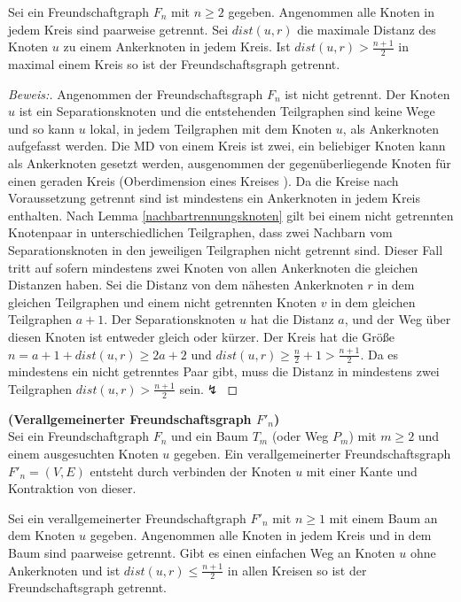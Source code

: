 \vspace{-1mm}
\begin{lem}
\label{fg}
Sei ein Freundschaftgraph $F_n$ mit $n\geq 2$ gegeben. Angenommen alle Knoten in jedem Kreis sind paarweise getrennt. Sei $dist(u,r)$ die maximale Distanz des Knoten $u$ zu einem Ankerknoten in jedem Kreis. Ist $dist(u,r)>\frac{n+1}{2}$ in maximal einem Kreis so ist der Freundschaftsgraph getrennt.
\end{lem}
\vspace{-4mm}
\begin{proof}[Beweis:]
Angenommen der Freundschaftsgraph $F_n$ ist nicht getrennt. Der Knoten $u$ ist ein Separationsknoten und die entstehenden Teilgraphen sind keine Wege und so kann $u$ lokal, in jedem Teilgraphen mit dem Knoten $u$, als Ankerknoten aufgefasst werden. Die MD von einem Kreis ist zwei, ein beliebiger Knoten kann als Ankerknoten gesetzt werden, ausgenommen der gegenüberliegende Knoten für einen geraden Kreis (Oberdimension eines Kreises \cite{upper}). Da die Kreise nach Voraussetzung getrennt sind ist mindestens ein Ankerknoten in jedem Kreis enthalten. Nach Lemma \ref{nachbartrennungsknoten} gilt bei einem nicht getrennten Knotenpaar in unterschiedlichen Teilgraphen, dass zwei Nachbarn vom Separationsknoten in den jeweiligen Teilgraphen nicht getrennt sind.\newline
Dieser Fall tritt auf sofern mindestens zwei Knoten von allen Ankerknoten die gleichen Distanzen haben. Sei die Distanz von dem nähesten Ankerknoten $r$ in dem gleichen Teilgraphen und einem nicht getrennten Knoten $v$ in dem gleichen Teilgraphen $a+1$. Der Separationsknoten $u$ hat die Distanz $a$, und der Weg über diesen Knoten ist entweder gleich oder kürzer. Der Kreis hat die Größe $n=a+1+dist(u,r)\geq 2a+2$ und $dist(u,r)\geq \frac{n}{2}+1 > \frac{n+1}{2}$. Da es mindestens ein nicht getrenntes Paar gibt, muss die Distanz in mindestens zwei Teilgraphen $dist(u,r)> \frac{n+1}{2}$ sein.$\lightning$
\end{proof}
\begin{defi}{\textbf{(Verallgemeinerter Freundschaftsgraph $F'_n$)}}\\
Sei ein Freundschaftgraph $F_n$ und ein Baum $T_m$ (oder Weg $P_m$) mit $m \geq 2$ und einem ausgesuchten Knoten $u$ gegeben. Ein verallgemeinerter Freundschaftsgraph $F'_{n}=(V,E)$ entsteht durch verbinden der Knoten $u$ mit einer Kante und Kontraktion von dieser.
\end{defi}
\vspace{-2mm}
\begin{lem}
Sei ein verallgemeinerter Freundschaftgraph $F'_n$ mit $n\geq 1$ mit einem Baum an dem Knoten $u$ gegeben. Angenommen alle Knoten in jedem Kreis und in dem Baum sind paarweise getrennt. Gibt es einen einfachen Weg an Knoten $u$ ohne Ankerknoten und ist $dist(u,r)\leq \frac{n+1}{2}$ in allen Kreisen so ist der Freundschaftsgraph getrennt.
\end{lem}
